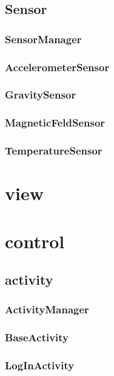 \documentclass[a4paper]{scrreprt}
\begin{document}
            \subsection{Sensor}

                \subsubsection{SensorManager}
                \subsubsection{AccelerometerSensor}
                \subsubsection{GravitySensor}
                \subsubsection{MagneticFeldSensor}
                \subsubsection{TemperatureSensor}


        \section{view}



        \section{control}

            \subsection{activity}

                \subsubsection{ActivityManager}
                \subsubsection{BaseActivity}
                \subsubsection{LogInActivity}
\end{document}
